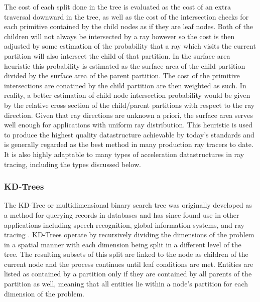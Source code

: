 \documentclass[12pt, a4paper]{article}
\begin{document}
The cost of each split done in the tree is evaluated as the cost of an extra traversal downward in the tree, as well as the cost of the intersection checks for each primitive contained by the child nodes as if they are leaf nodes. Both of the children will not always be intersected by a ray however so the cost is then adjusted by some estimation of the probability that a ray which visits the current partition will also intersect the child of that partition. In the surface area heuristic this probability is estimated as the surface area of the child partition divided by the surface area of the parent partition. The cost of the primitive intersections are conatined by the child partition are then weighted as such. In reality, a better estimation of child node intersection probability would be given by the relative cross section of the child/parent partitions with respect to the ray direction. Given that ray directions are unknown a priori, the surface area serves well enough for applications with uniform ray distribution. This heuristic is used to produce the highest quality datastructure achievable by today's standards and is generally regarded as the best method in many production ray tracers to date. It is also highly adaptable to many types of acceleration datastructures in ray tracing, including the types discussed below.

\subsubsection{KD-Trees}%

The KD-Tree or multidimensional binary search tree was originally developed as a method for querying records in databases and has since found use in other applications including speech recognition, global information systems, and ray tracing \cite{Bentley_1975}.  KD-Trees operate by recursively dividing the dimensions of the problem in a spatial manner with each dimension being split in a different level of the tree. The resulting subsets of this split are linked to the node as children of the current node and the process continues until leaf conditions are met. Entities are listed as contained by a partition only if they are contained by all parents of the partition as well, meaning that all entities lie within a node's partition for each dimension of the problem.
\end{document}
